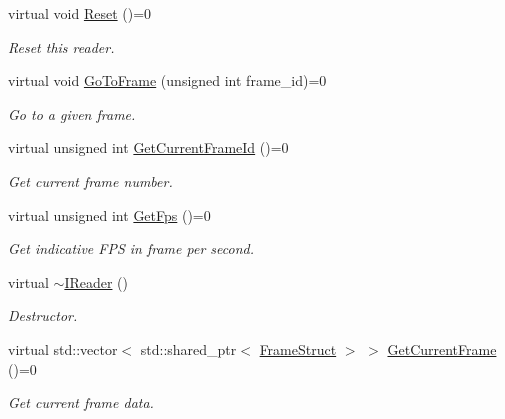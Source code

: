 \begin{DoxyCompactItemize}
\mbox{\label{classmoetsi_1_1ssp_1_1IReader_ad6e2ef78fc2466884aa877ecef54889d}} 
virtual void \hyperlink{classmoetsi_1_1ssp_1_1IReader_ad6e2ef78fc2466884aa877ecef54889d}{Reset} ()=0
\begin{DoxyCompactList}\small\item\em Reset this reader. \end{DoxyCompactList}\item 
virtual void \hyperlink{classmoetsi_1_1ssp_1_1IReader_a6f1be3c06538992cca6d550bd9566681}{Go\+To\+Frame} (unsigned int frame\+\_\+id)=0
\begin{DoxyCompactList}\small\item\em Go to a given frame. \end{DoxyCompactList}\item 
virtual unsigned int \hyperlink{classmoetsi_1_1ssp_1_1IReader_ac292d83eb06dee277baaa06e281a562d}{Get\+Current\+Frame\+Id} ()=0
\begin{DoxyCompactList}\small\item\em Get current frame number. \end{DoxyCompactList}\item 
virtual unsigned int \hyperlink{classmoetsi_1_1ssp_1_1IReader_a9f6a8650ca290b011b8e5451eeae9f32}{Get\+Fps} ()=0
\begin{DoxyCompactList}\small\item\em Get indicative F\+PS in frame per second. \end{DoxyCompactList}\item 
\mbox{\label{classmoetsi_1_1ssp_1_1IReader_ae1332862a7d81d99563f111ae36e142f}} 
virtual \hyperlink{classmoetsi_1_1ssp_1_1IReader_ae1332862a7d81d99563f111ae36e142f}{$\sim$\+I\+Reader} ()
\begin{DoxyCompactList}\small\item\em Destructor. \end{DoxyCompactList}\item 
\mbox{\label{classmoetsi_1_1ssp_1_1IReader_a357439182128e3911d77335c136035c0}} 
virtual std\+::vector$<$ std\+::shared\+\_\+ptr$<$ \hyperlink{structmoetsi_1_1ssp_1_1FrameStruct}{Frame\+Struct} $>$ $>$ \hyperlink{classmoetsi_1_1ssp_1_1IReader_a357439182128e3911d77335c136035c0}{Get\+Current\+Frame} ()=0
\begin{DoxyCompactList}\small\item\em Get current frame data. \end{DoxyCompactList}\item 

\end{DoxyCompactItemize}
